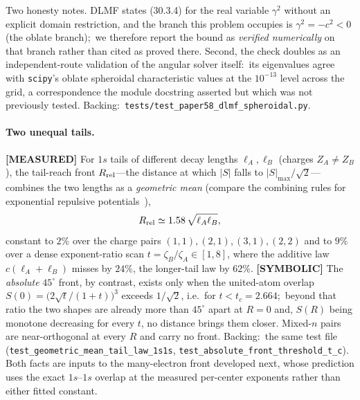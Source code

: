 \documentclass[aps,pra,twocolumn,superscriptaddress,longbibliography]{revtex4-2}
\newcommand{\gvq}[2]{#2}
\begin{document}
Two honesty notes.  DLMF states (30.3.4) for the real variable $\gamma^2$
without an explicit domain restriction, and the branch this problem
occupies is $\gamma^2 = -c^2 < 0$ (the oblate branch);\ we therefore report
the bound as \emph{verified numerically} on that branch rather than cited
as proved there.  Second, the check doubles as an independent-route
validation of the angular solver itself:\ its eigenvalues agree with
\texttt{scipy}'s oblate spheroidal characteristic values at the
$10^{-13}$ level across the grid, a correspondence the module docstring
asserted but which was not previously tested.  Backing:\
\texttt{tests/test\_paper58\_dlmf\_spheroidal.py}.

\paragraph{Two unequal tails.}
\textbf{[MEASURED]} For $1s$ tails of different decay lengths
$\ell_A, \ell_B$ (charges $Z_A \ne Z_B$), the tail-reach front
$R_{\rm rel}$---the distance at which $|S|$ falls to $|S|_{\max}/\sqrt2$---
combines the two lengths as a \emph{geometric mean} (compare the combining rules for
exponential repulsive potentials~\cite{smith1972}),
\begin{equation}
  R_{\rm rel} \simeq \gvq{tail_geometric_const}{1.58}\,\sqrt{\ell_A \ell_B},
  \label{eq:tail_geometric}
\end{equation}
constant to $2\%$ over the charge pairs $(1,1),(2,1),(3,1),(2,2)$ and to
$9\%$ over a dense exponent-ratio scan $t = \zeta_B/\zeta_A \in [1, 8]$,
where the additive law $c(\ell_A + \ell_B)$ misses by $24\%$, the
longer-tail law by $62\%$.  \textbf{[SYMBOLIC]} The \emph{absolute}
$45^\circ$ front, by contrast, exists only when the united-atom overlap
$S(0) = \bigl(2\sqrt t/(1+t)\bigr)^3$ exceeds $1/\sqrt2$, i.e.\ for
$t < t_c = \gvq{tail_t_c}{2.664}$;\ beyond that ratio the two shapes are
already more than $45^\circ$ apart at $R = 0$ and, $S(R)$ being monotone
decreasing for every $t$, no distance brings them closer.  Mixed-$n$ pairs are near-orthogonal at every $R$ and carry no
front.  Backing:\ the same test file
(\texttt{test\_geometric\_mean\_tail\_law\_1s1s},
\texttt{test\_absolute\_front\_threshold\_t\_c}).  Both facts are inputs
to the many-electron front developed next, whose prediction uses the exact
$1s$--$1s$ overlap at the measured per-center exponents rather than either
fitted constant.
\end{document}
